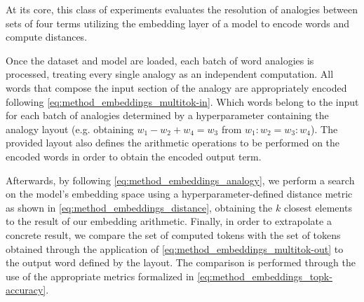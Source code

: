 At its core, this class of experiments evaluates the resolution of analogies between sets of four terms utilizing the embedding layer of a model to encode words and compute distances.

Once the dataset and model are loaded, each batch of word analogies is processed, treating every single analogy as an independent computation.
All words that compose the input section of the analogy are appropriately encoded following \cref{eq:method_embeddings_multitok-in}.
Which words belong to the input for each batch of analogies  determined by a hyperparameter containing the analogy layout (e.g. obtaining $w_1 - w_2 + w_4 = w_3$ from $w_1 : w_2 = w_3 : w_4$).
The provided layout also defines the arithmetic operations to be performed on the encoded words in order to obtain the encoded output term.

Afterwards, by following \cref{eq:method_embeddings_analogy}, we perform a search on the model's embedding space using a hyperparameter-defined distance metric as shown in \cref{eq:method_embeddings_distance}, obtaining the $k$ closest elements to the result of our embedding arithmetic.
Finally, in order to extrapolate a concrete result, we compare the set of computed tokens with the set of tokens obtained through the application of \cref{eq:method_embeddings_multitok-out} to the output word defined by the layout.
The comparison is performed through the use of the appropriate metrics formalized in \cref{eq:method_embeddings_topk-accuracy}.


